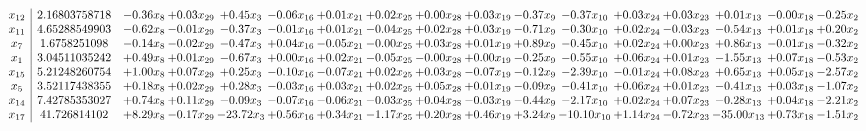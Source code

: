 \documentclass[9pt]{article}
\begin{document}
 \[\begin{array}{c| c c@{\hskip 2pt} c@{\hskip 2pt} c@{\hskip 2pt} c@{\hskip 2pt} c@{\hskip 2pt} c@{\hskip 2pt} c@{\hskip 2pt} c@{\hskip 2pt} c@{\hskip 2pt} c@{\hskip 2pt} c@{\hskip 2pt} c@{\hskip 2pt} c@{\hskip 2pt} c@{\hskip 2pt} c@{\hskip 2pt} }
 x_{12}   &  2.16803758718 & -0.36 x_{8} & +  0.03 x_{29} & +  0.45 x_{3} & -0.06 x_{16} & +  0.01 x_{21} & +  0.02 x_{25} & +  0.00 x_{28} & +  0.03 x_{19} & -0.37 x_{9} & -0.37 x_{10} & +  0.03 x_{24} & +  0.03 x_{23} & +  0.01 x_{13} & -0.00 x_{18} & -0.25 x_{2}\\
 x_{11}   &  4.65288549903 & -0.62 x_{8} & -0.01 x_{29} & -0.37 x_{3} & -0.01 x_{16} & +  0.01 x_{21} & -0.04 x_{25} & +  0.02 x_{28} & +  0.03 x_{19} & -0.71 x_{9} & -0.30 x_{10} & +  0.02 x_{24} & -0.03 x_{23} & -0.54 x_{13} & +  0.01 x_{18} & +  0.20 x_{2}\\
 x_{7}   &  1.6758251098 & -0.14 x_{8} & -0.02 x_{29} & -0.47 x_{3} & +  0.04 x_{16} & -0.05 x_{21} & -0.00 x_{25} & +  0.03 x_{28} & +  0.01 x_{19} & +  0.89 x_{9} & -0.45 x_{10} & +  0.02 x_{24} & +  0.00 x_{23} & +  0.86 x_{13} & -0.01 x_{18} & -0.32 x_{2}\\
 x_{1}   &  3.04511035242 & +  0.49 x_{8} & +  0.01 x_{29} & -0.67 x_{3} & +  0.00 x_{16} & +  0.02 x_{21} & -0.05 x_{25} & -0.00 x_{28} & +  0.00 x_{19} & -0.25 x_{9} & -0.55 x_{10} & +  0.06 x_{24} & +  0.01 x_{23} & -1.55 x_{13} & +  0.07 x_{18} & -0.53 x_{2}\\
 x_{15}   &  5.21248260754 & +  1.00 x_{8} & +  0.07 x_{29} & +  0.25 x_{3} & -0.10 x_{16} & -0.07 x_{21} & +  0.02 x_{25} & +  0.03 x_{28} & -0.07 x_{19} & -0.12 x_{9} & -2.39 x_{10} & -0.01 x_{24} & +  0.08 x_{23} & +  0.65 x_{13} & +  0.05 x_{18} & -2.57 x_{2}\\
 x_{5}   &  3.52117438355 & +  0.18 x_{8} & +  0.02 x_{29} & +  0.28 x_{3} & -0.03 x_{16} & +  0.03 x_{21} & +  0.02 x_{25} & +  0.05 x_{28} & +  0.01 x_{19} & -0.09 x_{9} & -0.41 x_{10} & +  0.06 x_{24} & +  0.01 x_{23} & -0.41 x_{13} & +  0.03 x_{18} & -1.07 x_{2}\\
 x_{14}   &  7.42785353027 & +  0.74 x_{8} & +  0.11 x_{29} & -0.09 x_{3} & -0.07 x_{16} & -0.06 x_{21} & -0.03 x_{25} & +  0.04 x_{28} & -0.03 x_{19} & -0.44 x_{9} & -2.17 x_{10} & +  0.02 x_{24} & +  0.07 x_{23} & -0.28 x_{13} & +  0.04 x_{18} & -2.21 x_{2}\\
 x_{17}   &  41.726814102 & +  8.29 x_{8} & -0.17 x_{29} & -23.72 x_{3} & +  0.56 x_{16} & +  0.34 x_{21} & -1.17 x_{25} & +  0.20 x_{28} & +  0.46 x_{19} & +  3.24 x_{9} & -10.10 x_{10} & +  1.14 x_{24} & -0.72 x_{23} & -35.00 x_{13} & +  0.73 x_{18} & -1.51 x_{2}\\

\end{array}\]
\end{document}
